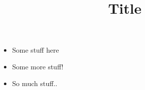 \documentclass{article}
\title{Title}
\date{}
\begin{document}
	\maketitle
	 
		\begin{itemize}
			\item Some stuff here
			\item Some more stuff!
			\item So much stuff..
		\end{itemize}
\end{document}
